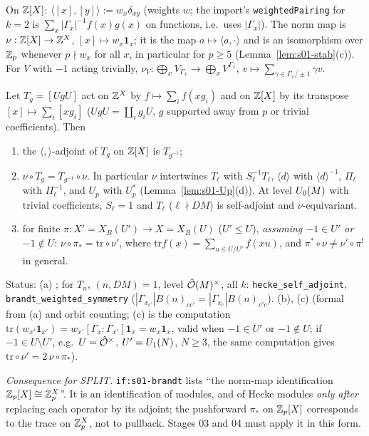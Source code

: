 \begin{definition}\label{def:s01-pairing}
On $\mathbb{Z}[X]$: $\langle[x],[y]\rangle:=w_x\delta_{xy}$ (weights $w$; the import's \texttt{weightedPairing} for $k=2$ is
$\sum_x|\Gamma_x|^{-1}f(x)g(x)$ on functions, i.e.\ uses $|\Gamma_x|$). The norm map is
$\nu:\mathbb{Z}[X]\to\mathbb{Z}^X$, $[x]\mapsto w_x\mathbf 1_x$; it is the map $a\mapsto\langle a,\cdot\rangle$ and is an isomorphism over
$\mathbb{Z}_p$ whenever $p\nmid w_x$ for all $x$, in particular for $p\ge5$ (Lemma~\ref{lem:s01-stab}(c)).
For $V$ with $-1$ acting trivially, $\nu_V:\bigoplus_xV_{\Gamma_x}\to\bigoplus_xV^{\Gamma_x}$, $v\mapsto\sum_{\gamma\in\Gamma_x/\pm1}\gamma v$.
\end{definition}

\begin{proposition}\label{prop:s01-adjoint}
Let $T_g=[UgU]$ act on $\mathbb{Z}^X$ by $f\mapsto\sum_if(xg_i)$ and on $\mathbb{Z}[X]$ by its transpose $[x]\mapsto\sum_i[xg_i]$
($UgU=\coprod_ig_iU$, $g$ supported away from $p$ or trivial coefficients). Then
\begin{enumerate}[label=(\alph*)]
\item the $\langle,\rangle$-adjoint of $T_g$ on $\mathbb{Z}[X]$ is $T_{g^{-1}}$;
\item $\nu\circ T_g=T_{g^{-1}}\circ\nu$. In particular $\nu$ intertwines $T_\ell$ with $S_\ell^{-1}T_\ell$, $\langle d\rangle$ with
  $\langle d\rangle^{-1}$, $\Pi_\ell$ with $\Pi_\ell^{-1}$, and $U_p$ with $U_p^{*}$ (Lemma~\ref{lem:s01-Up}(d)). At level
  $U_0(M)$ with trivial coefficients, $S_\ell=1$ and $T_\ell$ ($\ell\nmid DM$) is self-adjoint and $\nu$-equivariant.
\item for finite $\pi:X'=X_B(U')\to X=X_B(U)$ ($U'\le U$), \emph{assuming $-1\in U'$ or $-1\notin U$}: $\nu\circ\pi_*=\mathrm{tr}\circ\nu'$, where
  $\mathrm{tr}f(x)=\sum_{u\in U/U'}f(xu)$, and $\pi^*\circ\nu\ne\nu'\circ\pi^!$ in general.
\end{enumerate}
Status: (a) \stcited{} ; \stformal{} for $T_n$, $(n,DM)=1$, level $\hat{\mathcal{O}}(M)^\times$, all $k$:
 \texttt{hecke\_self\_adjoint},  \texttt{brandt\_weighted\_symmetry}
($|\Gamma_{x_{c'}}|B(n)_{cc'}=|\Gamma_{x_c}|B(n)_{c'c}$). (b), (c) \sttoprove{} (formal from (a) and orbit counting; (c) is the
computation $\mathrm{tr}(w_{x'}\mathbf 1_{x'})=w_{x'}[\Gamma_x:\Gamma_{x'}]\mathbf 1_x=w_x\mathbf1_x$, valid when $-1\in U'$ or
$-1\notin U$; if $-1\in U\setminus U'$, e.g.\ $U=\hat{\mathcal{O}}^\times$, $U'=U_1(N)$, $N\ge3$, the same computation gives
$\mathrm{tr}\circ\nu'=2\,\nu\circ\pi_*$).
\end{proposition}
\noindent\emph{Consequence for SPLIT.} \texttt{if:s01-brandt} lists ``the norm-map identification $\mathbb{Z}_p[X]\cong\mathbb{Z}_p^X$''.
It is an identification of modules, and of Hecke modules \emph{only after} replacing each operator by its adjoint; the
pushforward $\pi_*$ on $\mathbb{Z}_p[X]$ corresponds to the trace on $\mathbb{Z}_p^X$, not to pullback. Stages 03 and 04 must apply it in
this form.

